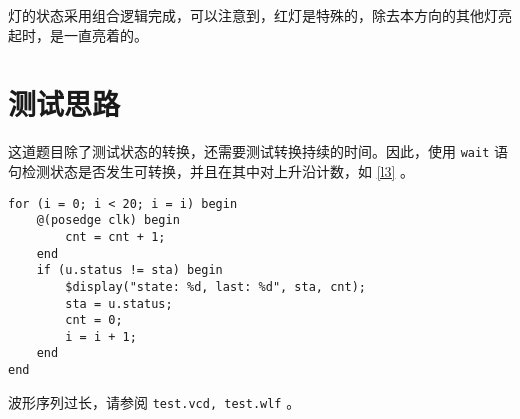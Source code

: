 \documentclass[lang=cn]{elegantpaper}
\begin{document}
灯的状态采用组合逻辑完成，可以注意到，红灯是特殊的，除去本方向的其他灯亮起时，是一直亮着的。

\section{测试思路}

这道题目除了测试状态的转换，还需要测试转换持续的时间。因此，使用 \lstinline{wait} 语句检测状态是否发生可转换，并且在其中对上升沿计数，如 \ref{l3} 。

\begin{lstlisting}[caption={状态计时},label={l3}]
for (i = 0; i < 20; i = i) begin
    @(posedge clk) begin
        cnt = cnt + 1; 
    end
    if (u.status != sta) begin
        $display("state: %d, last: %d", sta, cnt); 
        sta = u.status;
        cnt = 0;
        i = i + 1;
    end
end    
\end{lstlisting}

波形序列过长，请参阅 \lstinline{test.vcd, test.wlf} 。
\end{document}
